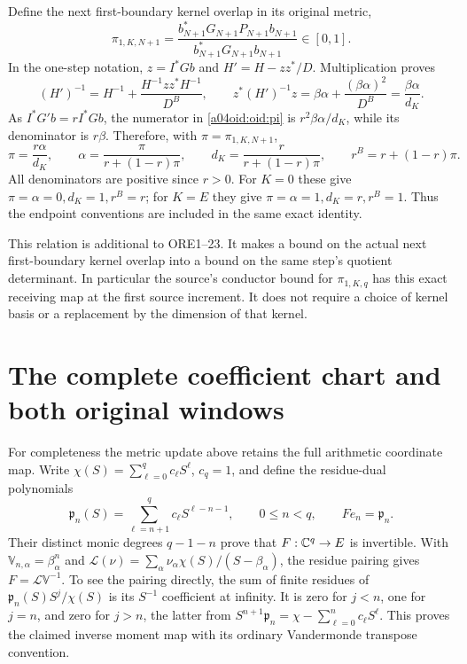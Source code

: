 \documentclass[11pt,a4paper]{article}
\begin{document}
Define the next first-boundary kernel overlap in its original metric,
\begin{equation}\label{a04oid:oid:pi}
 \pi_{1,K,N+1}
 =\frac{b_{N+1}^*G_{N+1}P_{N+1}b_{N+1}}
 {b_{N+1}^*G_{N+1}b_{N+1}}\in[0,1].
\end{equation}
In the one-step notation, $z=I^*Gb$ and
$H'=H-zz^*/D$. Multiplication proves
\[
 (H')^{-1}=H^{-1}
 +\frac{H^{-1}zz^*H^{-1}}{D^B},\qquad
 z^*(H')^{-1}z
 =\beta\alpha+\frac{(\beta\alpha)^2}{D^B}
 =\frac{\beta\alpha}{d_K}.
\]
As $I^*G'b=rI^*Gb$, the numerator in \eqref{a04oid:oid:pi} is
$r^2\beta\alpha/d_K$, while its denominator is $r\beta$.
Therefore, with $\pi=\pi_{1,K,N+1}$,
\begin{equation}\label{a04oid:oid:newallocation}
 \boxed{\pi=\frac{r\alpha}{d_K},\qquad
 \alpha=\frac{\pi}{r+(1-r)\pi},\qquad
 d_K=\frac r{r+(1-r)\pi},\qquad
 r^B=r+(1-r)\pi.}
\end{equation}
All denominators are positive since $r>0$. For $K=0$ these give
$\pi=\alpha=0,d_K=1,r^B=r$; for $K=E$ they give
$\pi=\alpha=1,d_K=r,r^B=1$. Thus the endpoint conventions are
included in the same exact identity.

This relation is additional to ORE1--23. It makes a bound on the
actual next first-boundary kernel overlap into a bound on the same
step's quotient determinant. In particular the source's conductor
bound for $\pi_{1,K,q}$ has this exact receiving map at the first
source increment. It does not require a choice of kernel basis or a
replacement by the dimension of that kernel.

\section{The complete coefficient chart and both original windows}

For completeness the metric update above retains the full arithmetic
coordinate map. Write $\chi(S)=\sum_{\ell=0}^qc_\ell S^\ell$,
$c_q=1$, and define the residue-dual polynomials
\[
 \mathfrak p_n(S)=\sum_{\ell=n+1}^qc_\ell S^{\ell-n-1},
 \qquad 0\le n<q,
 \qquad F e_n=\mathfrak p_n.
\]
Their distinct monic degrees $q-1-n$ prove that $F:\mathbb C^q\to E$
is invertible. With $\mathbb V_{n,\alpha}=\beta_\alpha^n$ and
$\mathcal L(\nu)=\sum_\alpha\nu_\alpha\chi(S)/(S-\beta_\alpha)$,
the residue pairing gives $F=\mathcal L\mathbb V^{-1}$. To see the
pairing directly, the sum of finite residues of
$\mathfrak p_n(S)S^j/\chi(S)$ is its $S^{-1}$ coefficient at infinity.
It is zero for $j<n$, one for $j=n$, and zero for $j>n$, the latter
from
$S^{n+1}\mathfrak p_n=\chi-\sum_{\ell=0}^nc_\ell S^\ell$.
This proves the claimed inverse moment map with its ordinary
Vandermonde transpose convention.
\end{document}
